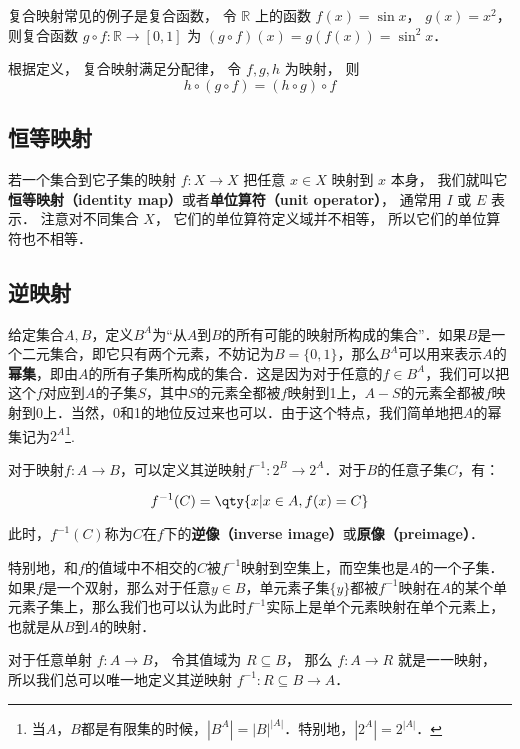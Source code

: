 复合映射常见的例子是复合函数， 令 $\mathbb R$ 上的函数 $f(x) = \sin x$， $g(x) = x^2$， 则复合函数 $g\circ f: \mathbb R \to [0, 1]$ 为 $(g\circ f)(x) = g(f(x)) = \sin^2 x$．

根据定义， 复合映射满足分配律， 令 $f, g, h$ 为映射， 则
\begin{equation}
h \circ (g \circ f) = (h \circ g) \circ f
\end{equation}

\subsection{恒等映射}
若一个集合到它子集的映射 $f:X\to X$ 把任意 $x\in X$ 映射到 $x$ 本身， 我们就叫它\textbf{恒等映射（identity map）}或者\textbf{单位算符（unit operator）}， 通常用 $I$ 或 $E$ 表示． 注意对不同集合 $X$， 它们的单位算符定义域并不相等， 所以它们的单位算符也不相等．



\subsection{逆映射}

给定集合$A, B$，定义$B^A$为“从$A$到$B$的所有可能的映射所构成的集合”．如果$B$是一个二元集合，即它只有两个元素，不妨记为$B=\{0,1\}$，那么$B^A$可以用来表示$A$的\textbf{幂集}，即由$A$的所有子集所构成的集合．这是因为对于任意的$f\in B^A$，我们可以把这个$f$对应到$A$的子集$S$，其中$S$的元素全都被$f$映射到1上，$A-S$的元素全都被$f$映射到0上．当然，0和1的地位反过来也可以．由于这个特点，我们简单地把$A$的幂集记为$2^A$\footnote{当$A$，$B$都是有限集的时候，$|B^A|=|B|^{|A|}$．特别地，$|2^A|=2^{|A|}$．}. 

对于映射$f:A\to B$，可以定义其逆映射$f^{-1}:2^B \to 2^A$．对于$B$的任意子集$C$，有：

\begin{equation}
f^{-1}(C) = \qty{x | x \in A, f(x) = C}
\end{equation}

此时，$f^{-1}(C)$称为$C$在$f$下的\textbf{逆像（inverse image）}或\textbf{原像（preimage）}．

特别地，和$f$的值域中不相交的$C$被$f^{-1}$映射到空集上，而空集也是$A$的一个子集．如果$f$是一个双射，那么对于任意$y\in B$，单元素子集$\{y\}$都被$f^{-1}$映射在$A$的某个单元素子集上，那么我们也可以认为此时$f^{-1}$实际上是单个元素映射在单个元素上，也就是从$B$到$A$的映射．

对于任意单射 $f:A\to B$， 令其值域为 $R \subseteq B$， 那么 $f:A\to R$ 就是一一映射， 所以我们总可以唯一地定义其逆映射 $f^{-1}:R \subseteq B \to A$．

